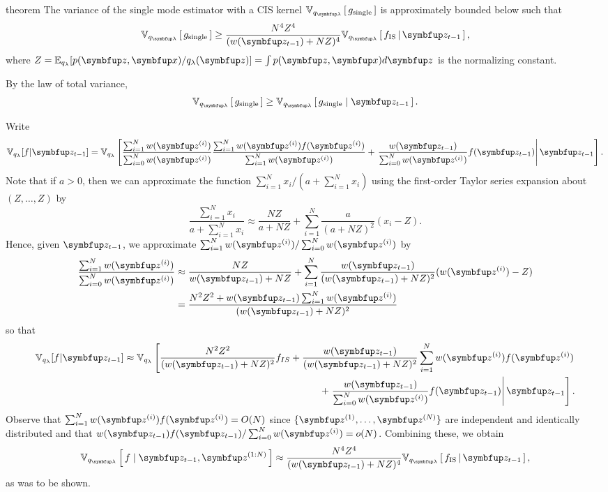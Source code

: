 
\begin{theoremEnd}{theorem}\label{thm:approx_var}
  The variance of the single mode estimator with a CIS kernel $\Vsub{q_{\vlambda}}{g_{\mathrm{single}}}$ is approximately bounded below such that
  \begin{align}
    \Vsub{q_{\vlambda}}{g_{\mathrm{single}}} \geq \frac{N^4 Z^4}{(w(\vz_{t-1}) + NZ)^4} \Vsub{q_{\vlambda}}{ f_{\text{IS}} \,\middle\vert\, \vz_{t-1} },
  \end{align}
  where $Z=\mathbb{E}_{q_\lambda}[p(\vz,\vx)/q_{\lambda}(\vz)]=\int p(\vz,\vx)d\vz$ is the normalizing constant.
\end{theoremEnd}
%
\begin{proofEnd}
  By the law of total variance,
  \begin{align}
    \Vsub{q_{\vlambda}}{g_{\mathrm{single}}} \geq \Vsub{q_{\vlambda}}{g_{\mathrm{single}} \mid \vz_{t-1}}.
  \end{align}

  Write
  \begin{align}
  \mathbb{V}_{q_\lambda}[f|\vz_{t-1}] = \mathbb{V}_{q_\lambda}\left[\frac{\sum_{i=1}^N w(\vz^{(i)})}{\sum_{i=0}^N w(\vz^{(i)})} \frac{\sum_{i=1}^N w(\vz^{(i)})f(\vz^{(i)})}{\sum_{i=1}^N w(\vz^{(i)})} + \left.\frac{w(\vz_{t-1})}{\sum_{i=0}^N w(\vz^{(i)})} f(\vz_{t-1})  \right\vert \vz_{t-1} \right].
  \end{align}
  Note that if $a>0$, then we can approximate the function $\sum_{i=1}^N x_i/(a+\sum_{i=1}^N x_i)$ using the first-order Taylor series expansion about $(Z,\dots,Z)$ by
  $$
  \frac{\sum_{i=1}^N x_i}{a+\sum_{i=1}^N x_i} \approx \frac{NZ}{a+NZ}+\sum_{i=1}^N \frac{a}{(a+NZ)^2} (x_i -Z).
  $$
  Hence, given $\vz_{t-1}$, we approximate $\sum_{i=1}^N w(\vz^{(i)})/\sum_{i=0}^N w(\vz^{(i)})$ by
  \begin{align}
  \frac{\sum_{i=1}^N w(\vz^{(i)})}{\sum_{i=0}^N w(\vz^{(i)})} &\approx \frac{NZ}{w(\vz_{t-1})+NZ} + \sum_{i=1}^N \frac{w(\vz_{t-1})}{(w(\vz_{t-1})+ NZ)^2} (w(\vz^{(i)})-Z) \\
    & = \frac{N^2 Z^2 + w(\vz_{t-1}) \sum_{i=1}^N w(\vz^{(i)})}{(w(\vz_{t-1})+NZ)^2}
  \end{align}
  so that
  \begin{align}
  \mathbb{V}_{q_\lambda}[f|\vz_{t-1}] \approx \mathbb{V}_{q_\lambda} \left[\frac{N^2Z^2}{(w(\vz_{t-1})+NZ)^2} f_{IS} + \frac{w(\vz_{t-1})}{(w(\vz_{t-1})+NZ)^2}\sum_{i=1}^N w(\vz^{(i)})f(\vz^{(i)})\right. \\ \left.
  + \left. \frac{w(\vz_{t-1})}{\sum_{i=0}^N w(\vz^{(i)})} f(\vz_{t-1}) \right\vert \vz_{t-1} \right].
  \end{align}
  Observe that $\sum_{i=1}^N w(\vz^{(i)}) f(\vz^{(i)}) = O(N)$ since $\{\vz^{(1)}, \dots, \vz^{(N)}\}$ are independent and identically distributed and that $w(\vz_{t-1})f(\vz_{t-1})/\sum_{i=0}^N w(\vz^{(i)})=o(N)$.
  Combining these, we obtain
  \begin{align}
    \Vsub{q_{\vlambda}}{  f \mid \vz_{t-1}, \vz^{(1:N)} } \approx \frac{N^4 Z^4}{(w(\vz_{t-1}) + NZ)^4} \Vsub{q_{\vlambda}}{ f_{\text{IS}} \,\middle\vert\, \vz_{t-1} },
  \end{align}
  as was to be shown.
\end{proofEnd}

